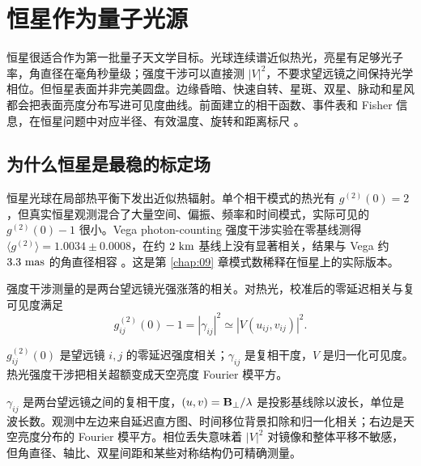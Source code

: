 \chapter{恒星作为量子光源}
\label{chap:10}

\begin{chapteropening}
恒星很适合作为第一批量子天文学目标。光球连续谱近似热光，亮星有足够光子率，角直径在毫角秒量级；强度干涉可以直接测 \(|V|^2\)，不要求望远镜之间保持光学相位。但恒星表面并非完美圆盘。边缘昏暗、快速自转、星斑、双星、脉动和星风都会把表面亮度分布写进可见度曲线。前面建立的相干函数、事件表和 Fisher 信息，在恒星问题中对应半径、有效温度、旋转和距离标尺 \citep{1956Natur.177...27B,1967MNRAS.137..375H,1967MNRAS.137..393H,1974MNRAS.167..121H,1974iiia.book.....H,2020NatAs...4.1164A,2024MNRAS.529.4387A}。
\end{chapteropening}

\section{为什么恒星是最稳的标定场}

恒星光球在局部热平衡下发出近似热辐射。单个相干模式的热光有 \(g^{(2)}(0)=2\)，但真实恒星观测混合了大量空间、偏振、频率和时间模式，实际可见的 \(g^{(2)}(0)-1\) 很小。Vega photon-counting 强度干涉实验在零基线测得 \(\langle g^{(2)}\rangle=1.0034\pm0.0008\)，在约 \(2~{\rm km}\) 基线上没有显著相关，结果与 Vega 约 \(3.3~{\rm mas}\) 的角直径相容 \citep{2021MNRAS.506.1585Z}。这是第 \ref{chap:09} 章模式数稀释在恒星上的实际版本。

强度干涉测量的是两台望远镜光强涨落的相关。对热光，校准后的零延迟相关与复可见度满足
\begin{equation}
  g^{(2)}_{ij}(0)-1 = |\gamma_{ij}|^2 \simeq |V(u_{ij},v_{ij})|^2 .
  \label{eq:ch10-g2-visibility}
\end{equation}
\begin{formulaexplain}
\(g^{(2)}_{ij}(0)\) 是望远镜 \(i,j\) 的零延迟强度相关；\(\gamma_{ij}\) 是复相干度，\(V\) 是归一化可见度。热光强度干涉把相关超额变成天空亮度 Fourier 模平方。
\end{formulaexplain}
\(\gamma_{ij}\) 是两台望远镜之间的复相干度，\((u,v)={\bf B}_\perp/\lambda\) 是投影基线除以波长，单位是波长数。观测中左边来自延迟直方图、时间移位背景扣除和归一化相关；右边是天空亮度分布的 Fourier 模平方。相位丢失意味着 \(|V|^2\) 对镜像和整体平移不敏感，但角直径、轴比、双星间距和某些对称结构仍可精确测量。

